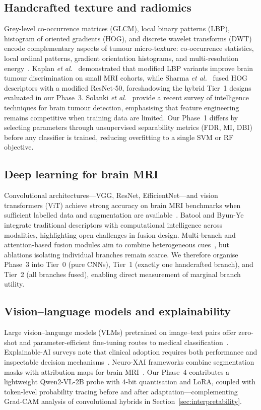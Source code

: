 \documentclass[11pt]{article}
\begin{document}
\subsection{Handcrafted texture and radiomics}
Grey-level co-occurrence matrices (GLCM), local binary patterns (LBP), histogram of oriented gradients (HOG), and discrete wavelet transforms (DWT) encode complementary aspects of tumour micro-texture: co-occurrence statistics, local ordinal patterns, gradient orientation histograms, and multi-resolution energy~\cite{ref30_icscss57650202310169700,ref61_jbspc2023104737}.
Kaplan \textit{et al.}~\cite{ref63_jmehy2020109696} demonstrated that modified LBP variants improve brain tumour discrimination on small MRI cohorts, while Sharma \textit{et al.}~\cite{ref61_jbspc2023104737} fused HOG descriptors with a modified ResNet-50, foreshadowing the hybrid Tier~1 designs evaluated in our Phase~3.
Solanki \textit{et al.}~\cite{ref15_access20233242666} provide a recent survey of intelligence techniques for brain tumour detection, emphasising that feature engineering remains competitive when training data are limited.
Our Phase~1 differs by selecting parameters through unsupervised separability metrics (FDR, MI, DBI) before any classifier is trained, reducing overfitting to a single SVM or RF objective.

\subsection{Deep learning for brain MRI}
Convolutional architectures---VGG, ResNet, EfficientNet---and vision transformers (ViT) achieve strong accuracy on brain MRI benchmarks when sufficient labelled data and augmentation are available~\cite{ref39_app14020642,ref56_s41598-024-56657-3}.
Batool and Byun-Ye~\cite{ref22_jcompbiomed2024108412} integrate traditional descriptors with computational intelligence across modalities, highlighting open challenges in fusion design.
Multi-branch and attention-based fusion modules aim to combine heterogeneous cues~\cite{ref56_s41598-024-56657-3}, but ablations isolating individual branches remain scarce.
We therefore organise Phase~3 into Tier~0 (pure CNNs), Tier~1 (exactly one handcrafted branch), and Tier~2 (all branches fused), enabling direct measurement of marginal branch utility.

\subsection{Vision--language models and explainability}
Large vision--language models (VLMs) pretrained on image--text pairs offer zero-shot and parameter-efficient fine-tuning routes to medical classification~\cite{ref82_jinffus2023101805}.
Explainable-AI surveys note that clinical adoption requires both performance and inspectable decision mechanisms~\cite{ref79_access20182870052}.
Neuro-XAI frameworks combine segmentation masks with attribution maps for brain MRI~\cite{ref12_jjneumeth2024110247}.
Our Phase~4 contributes a lightweight Qwen2-VL-2B probe with 4-bit quantisation and LoRA, coupled with token-level probability tracing before and after adaptation---complementing Grad-CAM analysis of convolutional hybrids in Section~\ref{sec:interpretability}.
\end{document}

